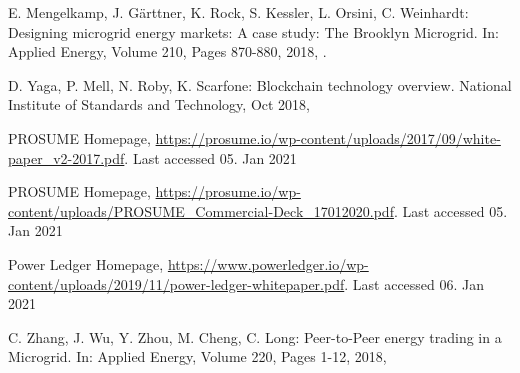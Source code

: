 \documentclass[runningheads]{llncs}
\begin{document}
\begin{thebibliography}{8}
E. Mengelkamp, J. Gärttner, K. Rock, S. Kessler, L. Orsini, C. Weinhardt: Designing microgrid energy markets: A case study: The Brooklyn Microgrid. In: Applied Energy, Volume 210, Pages 870-880, 2018, .

D. Yaga, P. Mell, N. Roby, K. Scarfone: Blockchain technology overview. National Institute of Standards and Technology, Oct 2018, 

PROSUME Homepage, \url{https://prosume.io/wp-content/uploads/2017/09/white-paper\_v2-2017.pdf}. Last accessed 05. Jan 2021

PROSUME Homepage, \url{https://prosume.io/wp-content/uploads/PROSUME\_Commercial-Deck\_17012020.pdf}. Last accessed 05. Jan 2021

Power Ledger Homepage, \url{https://www.powerledger.io/wp-content/uploads/2019/11/power-ledger-whitepaper.pdf}. Last accessed 06. Jan 2021

C. Zhang, J. Wu, Y. Zhou, M. Cheng, C. Long: Peer-to-Peer energy trading in a Microgrid. In: Applied Energy, Volume 220, Pages 1-12, 2018, 

\end{thebibliography}
\end{document}

